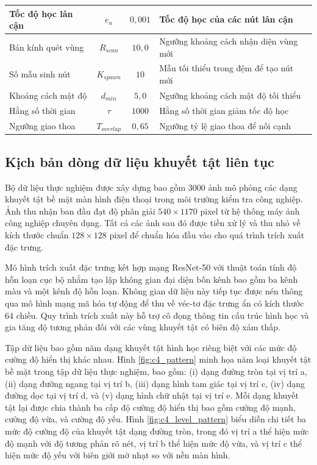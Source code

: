 \begin{table}[htbp]
\begin{tabularx}{\textwidth}{|l|c|c|X|}
Tốc độ học lân cận 
& $e_n$ & $0{,}001$ 
& Tốc độ học của các nút lân cận \\ \hline

Bán kính quét vùng 
& $R_{scan}$ & $10{,}0$ 
& Ngưỡng khoảng cách nhận diện vùng mới \\ \hline

Số mẫu sinh nút 
& $K_{spawn}$ & $10$ 
& Mẫu tối thiểu trong đệm để tạo nút mới \\ \hline

Khoảng cách mật độ 
& $d_{min}$ & $5{,}0$ 
& Ngưỡng khoảng cách mật độ tối thiểu \\ \hline

Hằng số thời gian 
& $\tau$ & $1000$ 
& Hằng số thời gian giảm tốc độ học \\ \hline

Ngưỡng giao thoa 
& $T_{overlap}$ & $0{,}65$ 
& Ngưỡng tỷ lệ giao thoa để nối cạnh \\ \hline

\end{tabularx}

\end{table}

\subsection{Kịch bản dòng dữ liệu khuyết tật liên tục}
\label{sec:4_1_2_data_stream_scenario}

Bộ dữ liệu thực nghiệm được xây dựng bao gồm $3000$ ảnh mô phỏng các dạng khuyết tật bề mặt màn hình điện thoại trong môi trường kiểm tra công nghiệp. Ảnh thu nhận ban đầu đạt độ phân giải $540 \times 1170$ pixel từ hệ thống máy ảnh công nghiệp chuyên dụng. Tất cả các ảnh sau đó được tiền xử lý và thu nhỏ về kích thước chuẩn $128 \times 128$ pixel để chuẩn hóa đầu vào cho quá trình trích xuất đặc trưng.

Mô hình trích xuất đặc trưng kết hợp mạng ResNet-50 \cite{he2016deep} với thuật toán tính độ hỗn loạn cục bộ nhằm tạo lập không gian đại diện bốn kênh bao gồm ba kênh màu và một kênh độ hỗn loạn. Không gian dữ liệu này tiếp tục được nén thông qua mô hình mạng mã hóa tự động để thu về véc-tơ đặc trưng ẩn có kích thước $64$ chiều. Quy trình trích xuất này hỗ trợ cô đọng thông tin cấu trúc hình học và gia tăng độ tương phản đối với các vùng khuyết tật có biên độ xám thấp.

Tập dữ liệu bao gồm năm dạng khuyết tật hình học riêng biệt với các mức độ cường độ hiển thị khác nhau. Hình \ref{fig:c4_pattern} minh họa năm loại khuyết tật bề mặt trong tập dữ liệu thực nghiệm, bao gồm: (i) dạng đường tròn tại vị trí a, (ii) dạng đường ngang tại vị trí b, (iii) dạng hình tam giác tại vị trí c, (iv) dạng đường dọc tại vị trí d, và (v) dạng hình chữ nhật tại vị trí e. Mỗi dạng khuyết tật lại được chia thành ba cấp độ cường độ hiển thị bao gồm cường độ mạnh, cường độ vừa, và cường độ yếu. Hình \ref{fig:c4_level_pattern} biểu diễn chi tiết ba mức độ cường độ của khuyết tật dạng đường tròn, trong đó vị trí a thể hiện mức độ mạnh với độ tương phản rõ nét, vị trí b thể hiện mức độ vừa, và vị trí c thể hiện mức độ yếu với biên giới mờ nhạt so với nền màn hình.

